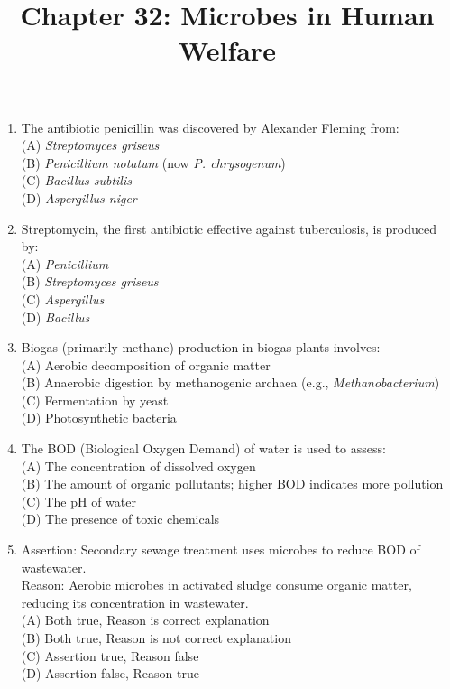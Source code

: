 \documentclass{article}
\begin{document}
\title{Chapter 32: Microbes in Human Welfare}
\date{}
\maketitle

\begin{enumerate}[label=Q\arabic*.]

\item The antibiotic penicillin was discovered by Alexander Fleming from:
\\(A) \textit{Streptomyces griseus}
\\(B) \textit{Penicillium notatum} (now \textit{P. chrysogenum})
\\(C) \textit{Bacillus subtilis}
\\(D) \textit{Aspergillus niger}

\item Streptomycin, the first antibiotic effective against tuberculosis, is produced by:
\\(A) \textit{Penicillium}
\\(B) \textit{Streptomyces griseus}
\\(C) \textit{Aspergillus}
\\(D) \textit{Bacillus}

\item Biogas (primarily methane) production in biogas plants involves:
\\(A) Aerobic decomposition of organic matter
\\(B) Anaerobic digestion by methanogenic archaea (e.g., \textit{Methanobacterium})
\\(C) Fermentation by yeast
\\(D) Photosynthetic bacteria

\item The BOD (Biological Oxygen Demand) of water is used to assess:
\\(A) The concentration of dissolved oxygen
\\(B) The amount of organic pollutants; higher BOD indicates more pollution
\\(C) The pH of water
\\(D) The presence of toxic chemicals

\item Assertion: Secondary sewage treatment uses microbes to reduce BOD of wastewater.\\
Reason: Aerobic microbes in activated sludge consume organic matter, reducing its concentration in wastewater.
\\(A) Both true, Reason is correct explanation
\\(B) Both true, Reason is not correct explanation
\\(C) Assertion true, Reason false
\\(D) Assertion false, Reason true


\end{enumerate}
\end{document}
